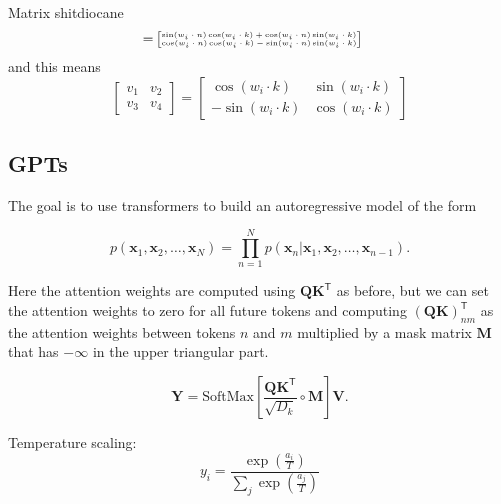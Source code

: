 \documentclass[a4paper,9pt]{extarticle}
\newcommand{\trans}[1]{{#1}^{\mathsf{T}}}
\begin{document}
\begin{multicols*}{2}
\begin{myproof}{Matrix shit}{diocane}
\begin{align*}
				=&\tiny\begin{bmatrix}
				\sin(w_{i}\cdot n)\cos(w_{i}\cdot k)+\cos(w_{i}\cdot n)\sin(w_{i}\cdot k)\\
				\cos(w_{i}\cdot n)\cos(w_{i}\cdot k)-\sin(w_{i}\cdot n)\sin(w_{i}\cdot k)
				\end{bmatrix}
			\end{align*}
			and this means
			\begin{equation*}
				\begin{bmatrix}
					v_{1}&v_{2}\\
					v_{3}&v_{4}
				\end{bmatrix}=\begin{bmatrix}
				\cos(w_{i}\cdot k)&\sin(w_{i}\cdot k)\\
				-\sin(w_{i}\cdot k)&\cos(w_{i}\cdot k)
				\end{bmatrix}
			\end{equation*}
		\end{myproof}
		\subsection{GPTs}
		The goal is to use transformers to build an autoregressive model of the form
		\begin{riquadro}
			\begin{equation*}
				p(\mathbf{x}_{1},\mathbf{x}_{2},\ldots,\mathbf{x}_{N})=\prod_{n=1}^{N}p(\mathbf{x}_{n}|\mathbf{x}_{1},\mathbf{x}_{2},\ldots,\mathbf{x}_{n-1}).
			\end{equation*}
		\end{riquadro}
		Here the attention weights are computed using $\mathbf{QK}^{\mathsf{T}}$ as before, but we can set the attention weights to zero for all future tokens and computing $\trans{(\mathbf{QK})}_{nm}$ as the attention weights between tokens $n$ and $m$ multiplied by a mask matrix $\mathbf{M}$ that has $-\infty$ in the upper triangular part.
		\begin{riquadro}
			\begin{equation*}
				\mathbf{Y}=\text{SoftMax}\left[\frac{\trans{\mathbf{QK}}}{\sqrt{D_{k}}}\circ \mathbf{M}\right]\mathbf{V}.
			\end{equation*}
		\end{riquadro}
		Temperature scaling:
		\begin{equation*}
			y_{i}=\frac{\exp\left(\frac{a_{i}}{T}\right)}{\sum_{j}\exp\left(\frac{a_{j}}{T}\right)}
		\end{equation*}
	\end{multicols*}
\end{document}
